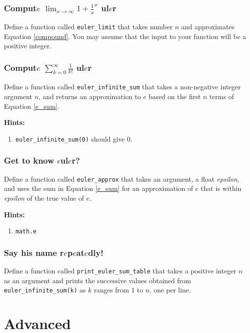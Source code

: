\documentclass[a4paper]{article}
\begin{document}
\subsubsection{Comput$e$ $\lim_{x \to \infty} {1 + \frac{1}{x}}^x$ ul$e$r}
Define a function called \texttt{euler\_limit} that takes number $n$ and approximates Equation \ref{compound}. You may assume that the input to your function will be a positive integer.

\subsubsection{Comput$e$ $\sum_{k=0}^{\infty}\frac{1}{k!}$ ul$e$r}
Define a function called \texttt{euler\_infinite\_sum} that takes a non-negative integer argument $n$, and returns an approximation to $e$ based on the first $n$ terms of Equation \ref{e_sum}.

\textbf{Hints:}
\begin{enumerate}
    \item \texttt{euler\_infinite\_sum(0)} should give $0$.
\end{enumerate}

\subsubsection{Get to know $\epsilon$ul$e$r?}
Define a function called \texttt{euler\_approx} that takes an argument, a float \textit{epsilon}, and uses the sum in Equation \ref{e_sum} for an approximation of $e$ that is within \textit{epsilon} of the true value of $e$. 

\textbf{Hints:}
\begin{enumerate}
    \item \texttt{math.e}
\end{enumerate}

\subsubsection{Say his name r$e$p$e$at$e$dly!}
Define a function called \texttt{print\_euler\_sum\_table} that takes a positive integer $n$ as an argument and prints the successive values obtained from \texttt{euler\_infinite\_sum(k)} as $k$ ranges from $1$ to $n$, one per line.


\newpage
\section{Advanced}
\end{document}

